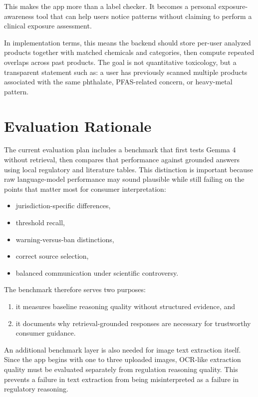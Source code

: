 \documentclass[11pt]{article}
\begin{document}
This makes the app more than a label checker. It becomes a personal exposure-awareness tool that can help users notice patterns without claiming to perform a clinical exposure assessment.

In implementation terms, this means the backend should store per-user analyzed products together with matched chemicals and categories, then compute repeated overlaps across past products. The goal is not quantitative toxicology, but a transparent statement such as: a user has previously scanned multiple products associated with the same phthalate, PFAS-related concern, or heavy-metal pattern.

\section{Evaluation Rationale}

The current evaluation plan includes a benchmark that first tests Gemma 4 without retrieval, then compares that performance against grounded answers using local regulatory and literature tables. This distinction is important because raw language-model performance may sound plausible while still failing on the points that matter most for consumer interpretation:

\begin{itemize}[leftmargin=1.5em]
\item jurisdiction-specific differences,
\item threshold recall,
\item warning-versus-ban distinctions,
\item correct source selection,
\item balanced communication under scientific controversy.
\end{itemize}

The benchmark therefore serves two purposes:

\begin{enumerate}[leftmargin=1.5em]
\item it measures baseline reasoning quality without structured evidence, and
\item it documents why retrieval-grounded responses are necessary for trustworthy consumer guidance.
\end{enumerate}

An additional benchmark layer is also needed for image text extraction itself. Since the app begins with one to three uploaded images, OCR-like extraction quality must be evaluated separately from regulation reasoning quality. This prevents a failure in text extraction from being misinterpreted as a failure in regulatory reasoning.
\end{document}
